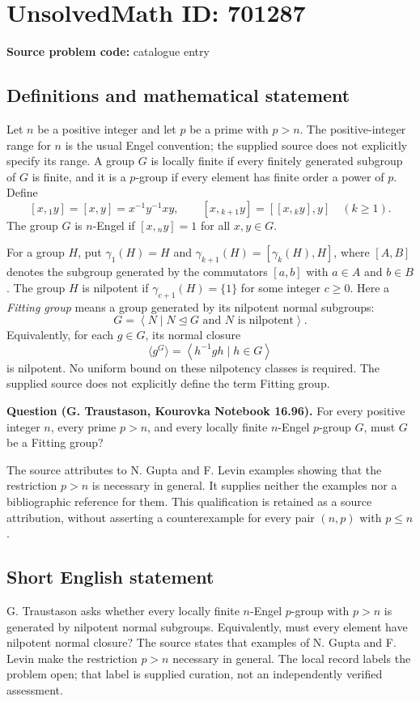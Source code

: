 \documentclass[11pt]{article}
\begin{document}
\section*{UnsolvedMath ID: 701287}
\textbf{Source problem code:} catalogue entry
\subsection{Definitions and mathematical statement}
Let \(n\) be a positive integer and let \(p\) be a prime with \(p>n\). The positive-integer range for \(n\) is the usual Engel convention; the supplied source does not explicitly specify its range. A group \(G\) is locally finite if every finitely generated subgroup of \(G\) is finite, and it is a \(p\)-group if every element has finite order a power of \(p\). Define
\[
[x,{}_1y]=[x,y]=x^{-1}y^{-1}xy,\qquad [x,{}_{k+1}y]=[[x,{}_ky],y]\quad(k\geq 1).
\]
The group \(G\) is \(n\)-Engel if \([x,{}_ny]=1\) for all \(x,y\in G\).

For a group \(H\), put \(\gamma_1(H)=H\) and \(\gamma_{k+1}(H)=[\gamma_k(H),H]\), where \([A,B]\) denotes the subgroup generated by the commutators \([a,b]\) with \(a\in A\) and \(b\in B\). The group \(H\) is nilpotent if \(\gamma_{c+1}(H)=\{1\}\) for some integer \(c\geq 0\). Here a \emph{Fitting group} means a group generated by its nilpotent normal subgroups:
\[
G=\left\langle N\mid N\trianglelefteq G\text{ and }N\text{ is nilpotent}\right\rangle.
\]
Equivalently, for each \(g\in G\), its normal closure
\[
\langle g^G\rangle=\left\langle h^{-1}gh\mid h\in G\right\rangle
\]
is nilpotent. No uniform bound on these nilpotency classes is required. The supplied source does not explicitly define the term Fitting group.

\textbf{Question (G. Traustason, Kourovka Notebook 16.96).} For every positive integer \(n\), every prime \(p>n\), and every locally finite \(n\)-Engel \(p\)-group \(G\), must \(G\) be a Fitting group?

The source attributes to N. Gupta and F. Levin examples showing that the restriction \(p>n\) is necessary in general. It supplies neither the examples nor a bibliographic reference for them. This qualification is retained as a source attribution, without asserting a counterexample for every pair \((n,p)\) with \(p\leq n\).
\subsection{Short English statement}
G. Traustason asks whether every locally finite \(n\)-Engel \(p\)-group with \(p>n\) is generated by nilpotent normal subgroups. Equivalently, must every element have nilpotent normal closure? The source states that examples of N. Gupta and F. Levin make the restriction \(p>n\) necessary in general. The local record labels the problem open; that label is supplied curation, not an independently verified assessment.
\end{document}
